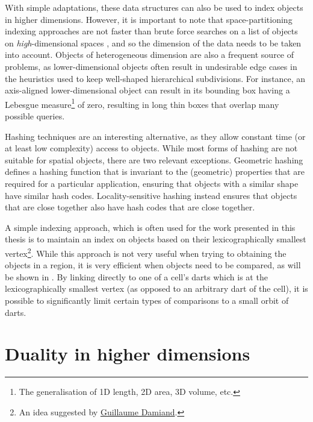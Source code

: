 With simple adaptations, these data structures can also be used to index objects in higher dimensions.
However, it is important to note that space-partitioning indexing approaches are not faster than brute force searches on a list of objects on \emph{high}-dimensional spaces \citep{Weber98}, and so the dimension of the data needs to be taken into account.
Objects of heterogeneous dimension are also a frequent source of problems, as lower-dimensional objects often result in undesirable edge cases in the heuristics used to keep well-shaped hierarchical subdivisions.
For instance, an axis-aligned lower-dimensional object can result in its bounding box having a Lebesgue measure\footnote{The generalisation of 1D length, 2D area, 3D volume, etc.} of zero, resulting in long thin boxes that overlap many possible queries.

Hashing techniques are an interesting alternative, as they allow constant time (or at least low complexity)  access to objects.
While most forms of hashing are not suitable for spatial objects, there are two relevant exceptions.
Geometric hashing \citep{Wolfson97} defines a hashing function that is invariant to the (geometric) properties that are required for a particular application, ensuring that objects with a similar shape have similar hash codes.
Locality-sensitive hashing \citep{Andoni08} instead ensures that objects that are close together also have hash codes that are close together.

A simple indexing approach, which is often used for the work presented in this thesis is to maintain an index on objects based on their lexicographically smallest vertex\footnote{An idea suggested by \href{http://liris.cnrs.fr/guillaume.damiand/}{Guillaume Damiand}.}.
While this approach is not very useful when trying to obtaining the objects in a region, it is very efficient when objects need to be compared, as will be shown in .
By linking directly to one of a cell's darts which is at the lexicographically smallest vertex (as opposed to an arbitrary dart of the cell), it is possible to significantly limit certain types of comparisons to a small orbit of darts.

\section{Duality in higher dimensions}
\label{se:duality}

